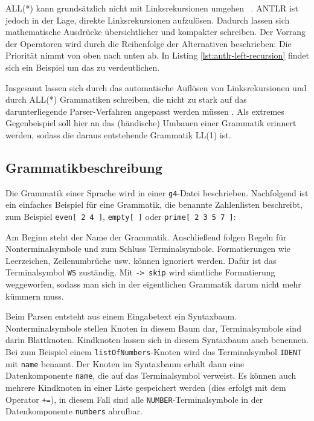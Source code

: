 ALL(*) kann grundsätzlich nicht mit Linksrekursionen umgehen \cite{ANTLR4Reference} \cite{ANTLRALLStar}. ANTLR ist jedoch in der Lage, direkte Linksrekursionen aufzulösen. Dadurch lassen sich mathematische Ausdrücke übersichtlicher und kompakter schreiben. Der Vorrang der Operatoren wird durch die Reihenfolge der Alternativen beschrieben: Die Priorität nimmt von oben nach unten ab. In Listing \ref{lst:antlr-left-recursion} findet sich ein Beispiel um das zu verdeutlichen.



Insgesamt lassen sich durch das automatische Auflösen von Linksrekursionen und durch ALL(*) Grammatiken schreiben, die nicht zu stark auf das darunterliegende Parser-Verfahren angepasst werden müssen \cite{ANTLR4Reference}. Als extremes Gegenbeispiel soll hier an das (händische) Umbauen einer Grammatik erinnert werden, sodass die daraus entstehende Grammatik LL(1) ist.

\subsection{Grammatikbeschreibung}

Die Grammatik einer Sprache wird in einer \lstinline{g4}-Datei beschrieben. Nachfolgend ist ein einfaches Beispiel für eine Grammatik, die benannte Zahlenlisten beschreibt, zum Beispiel \lstinline{even[ 2 4 ]}, \lstinline{empty[ ]} oder \lstinline{prime[ 2 3 5 7 ]}:



Am Beginn steht der Name der Grammatik. Anschließend folgen Regeln für Nonterminalsymbole und zum Schluss Terminalsymbole. Formatierungen wie Leerzeichen, Zeilenumbrüche usw. können ignoriert werden. Dafür ist das Terminalsymbol \lstinline{WS} zuständig. Mit \lstinline{-> skip} wird sämtliche Formatierung weggeworfen, sodass man sich in der eigentlichen Grammatik darum nicht mehr kümmern muss. 

Beim Parsen entsteht aus einem Eingabetext ein Syntaxbaum. Nonterminalsymbole stellen Knoten in diesem Baum dar, Terminalsymbole sind darin Blattknoten. Kindknoten lassen sich in diesem Syntaxbaum auch benennen. Bei zum Beispiel einem \lstinline{listOfNumbers}-Knoten wird das Terminalsymbol \lstinline{IDENT} mit \lstinline{name} benannt. Der Knoten im Syntaxbaum erhält dann eine Datenkomponente \lstinline{name}, die auf das Terminalsymbol verweist. Es können auch mehrere Kindknoten in einer Liste gespeichert werden (dies erfolgt mit dem Operator \lstinline{+=}), in diesem Fall sind alle \lstinline{NUMBER}-Terminalsymbole in der Datenkomponente \lstinline{numbers} abrufbar.

